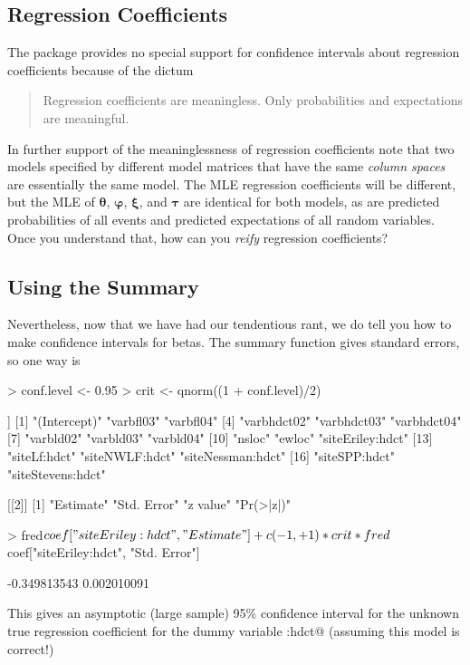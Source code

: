 \documentclass[11pt]{article}
\newcommand{\boldtheta}{{\boldsymbol{\theta}}}
\newcommand{\boldxi}{{\boldsymbol{\xi}}}
\newcommand{\boldtau}{{\boldsymbol{\tau}}}
\newcommand{\boldvarphi}{{\boldsymbol{\varphi}}}
\begin{document}
\subsection{Regression Coefficients}

The package provides no special support for confidence intervals about
regression coefficients because of the dictum
\begin{quote}
Regression coefficients are meaningless.  Only probabilities and expectations
are meaningful.
\end{quote}

In further support of the meaninglessness of regression coefficients note
that two models specified by different model matrices that have the
same \emph{column spaces} are essentially the same model.  The MLE regression
coefficients will be different, but the MLE
of $\boldtheta$, $\boldvarphi$, $\boldxi$, and $\boldtau$ are identical
for both models,
as are predicted probabilities of all events and predicted expectations
of all random variables.  Once you understand that, how can you \emph{reify}
regression coefficients?

\subsection{Using the Summary}

Nevertheless, now that we have had our tendentious rant, we do tell you
how to make confidence intervals for betas.  The summary function gives
standard errors, so one way is
\begin{Schunk}
\begin{Sinput}
> conf.level <- 0.95
> crit <- qnorm((1 + conf.level)/2)
\end{Sinput}
\end{Schunk}
\begin{Schunk}
\begin{Soutput}
[[1]]
 [1] "(Intercept)"      "varbfl03"         "varbfl04"        
 [4] "varbhdct02"       "varbhdct03"       "varbhdct04"      
 [7] "varbld02"         "varbld03"         "varbld04"        
[10] "nsloc"            "ewloc"            "siteEriley:hdct" 
[13] "siteLf:hdct"      "siteNWLF:hdct"    "siteNessman:hdct"
[16] "siteSPP:hdct"     "siteStevens:hdct"

[[2]]
[1] "Estimate"   "Std. Error" "z value"    "Pr(>|z|)"  
\end{Soutput}
\begin{Sinput}
> fred$coef["siteEriley:hdct", "Estimate"] + c(-1, 
+     1) * crit * fred$coef["siteEriley:hdct", "Std. Error"]
\end{Sinput}
\begin{Soutput}
[1] -0.349813543  0.002010091
\end{Soutput}
\end{Schunk}
This gives an asymptotic (large sample) 95\% confidence
interval for the unknown true regression coefficient for the dummy variable
\verb@siteEriley:hdct@ (assuming this model is correct!)
\end{document}
